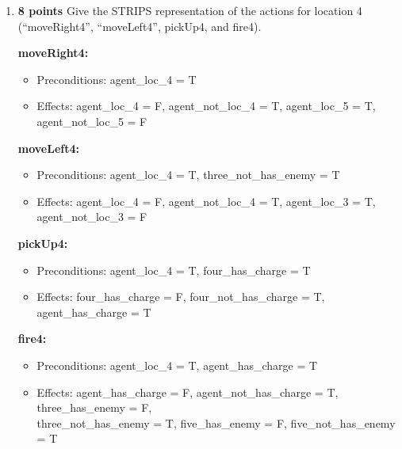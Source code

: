 \documentclass{article}
\def\ans#1{{\color{ans}#1}}
\begin{document}
\begin{enumerate}[label=(\alph*)]
{\begin{multicols}{2}
                nine\_has\_enemy \{T/F\} \\
                nine\_not\_has\_enemy \{T/F\} \\ \\
   		\end{multicols}
    } 
    \item \textbf{8 points} Give the STRIPS representation of the actions for location 4 (“moveRight4”, “moveLeft4”, pickUp4, and fire4). \\
    \ans{
        \textbf{moveRight4:}
        \begin{itemize}
            \item Preconditions:  agent\_loc\_4 = T
            \item Effects: agent\_loc\_4 = F, agent\_not\_loc\_4 = T, agent\_loc\_5 = T, agent\_not\_loc\_5 = F
        \end{itemize}
        \textbf{moveLeft4:}
        \begin{itemize}
            \item Preconditions:  agent\_loc\_4 = T, three\_not\_has\_enemy = T
            \item Effects: agent\_loc\_4 = F,  agent\_not\_loc\_4 = T, agent\_loc\_3 = T, agent\_not\_loc\_3 = F
        \end{itemize}
        \textbf{pickUp4:}
        \begin{itemize}
            \item Preconditions:  agent\_loc\_4 = T, four\_has\_charge = T 
            \item Effects: four\_has\_charge = F, four\_not\_has\_charge = T, agent\_has\_charge = T 
        \end{itemize}
        \textbf{fire4:}
        \begin{itemize}
            \item Preconditions: agent\_loc\_4 = T, agent\_has\_charge = T  
            \item Effects: agent\_has\_charge = F, agent\_not\_has\_charge = T, three\_has\_enemy = F,\\ three\_not\_has\_enemy = T, five\_has\_enemy = F, five\_not\_has\_enemy = T		 
        \end{itemize}
    }


\end{enumerate}
\end{document}
